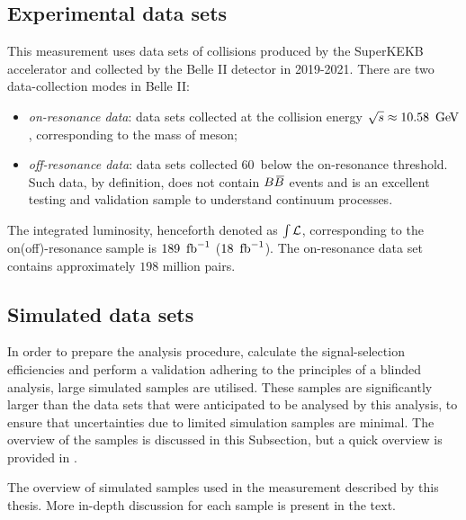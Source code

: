 
\subsection{Experimental data sets}\label{sec:data}

This measurement uses data sets of \epem collisions produced by the SuperKEKB accelerator and collected by the Belle II detector in 2019-2021.
There are two data-collection modes in Belle II:
\begin{itemize}
    \item \textit{on-resonance data}: data sets collected at the collision energy $\sqrt{s}\approx10.58~\mathrm{\,Ge\kern -0.1em V}$, corresponding to the mass of \FourS meson;
    \item \textit{off-resonance data}: data sets collected 60~\mev below the on-resonance threshold. 
    Such data, by definition, does not contain $B\kern 0.18em\overline{\kern -0.18em B}{}$ events and is an excellent testing and validation sample to understand continuum processes.
\end{itemize}
The integrated luminosity, henceforth denoted as $\int~\hspace{-7pt}~\mathcal{L}$, corresponding to the on(off)-resonance sample is $189~\mbox{\,fb}^{-1}$ ($18~\mbox{\,fb}^{-1}$).
The on-resonance data set contains approximately $198$ million \BB pairs.

\subsection{Simulated data sets}\label{sec:MC}

In order to prepare the analysis procedure, calculate the signal-selection efficiencies and perform a validation adhering to the principles of a blinded analysis, 
large simulated samples are utilised.
These samples are significantly larger than the data sets that were anticipated to be analysed by this analysis, to ensure that uncertainties due to limited simulation samples are minimal.
The overview of the samples is discussed in this Subsection, but a quick overview is provided in .

\begin{table}[htbp!]
    \centering
\caption{\label{tab:simulated_samples}The overview of simulated samples used in the measurement described by this thesis.
More in-depth discussion for each sample is present in the text.}

\end{table}


